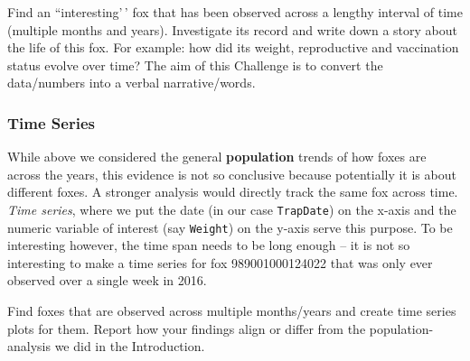 \documentclass[
  letterpaper,
]{report}
\begin{document}
\begin{tcolorbox}[enhanced jigsaw, titlerule=0mm, breakable, bottomrule=.15mm, colframe=quarto-callout-note-color-frame, opacityback=0, colback=white, rightrule=.15mm, toprule=.15mm, opacitybacktitle=0.6, bottomtitle=1mm, colbacktitle=quarto-callout-note-color!10!white, title={Fox Life Story}, toptitle=1mm, arc=.35mm, left=2mm, leftrule=.75mm, coltitle=black]

Find an ``interesting'\,' fox that has been observed across a lengthy
interval of time (multiple months and years). Investigate its record and
write down a story about the life of this fox. For example: how did its
weight, reproductive and vaccination status evolve over time? The aim of
this Challenge is to convert the data/numbers into a verbal
narrative/words.

\end{tcolorbox}

\subsubsection{Time Series}\label{time-series}

While above we considered the general \textbf{population} trends of how
foxes are across the years, this evidence is not so conclusive because
potentially it is about different foxes. A stronger analysis would
directly track the same fox across time. \emph{Time series}, where we
put the date (in our case \texttt{TrapDate}) on the x-axis and the
numeric variable of interest (say \texttt{Weight}) on the y-axis serve
this purpose. To be interesting however, the time span needs to be long
enough -- it is not so interesting to make a time series for fox
989001000124022 that was only ever observed over a single week in 2016.

\begin{tcolorbox}[enhanced jigsaw, titlerule=0mm, breakable, bottomrule=.15mm, colframe=quarto-callout-note-color-frame, opacityback=0, colback=white, rightrule=.15mm, toprule=.15mm, opacitybacktitle=0.6, bottomtitle=1mm, colbacktitle=quarto-callout-note-color!10!white, title={Fox Time Series}, toptitle=1mm, arc=.35mm, left=2mm, leftrule=.75mm, coltitle=black]

Find foxes that are observed across multiple months/years and create
time series plots for them. Report how your findings align or differ
from the population-analysis we did in the Introduction.

\end{tcolorbox}

\subsubsection{}\label{section}
\end{document}
